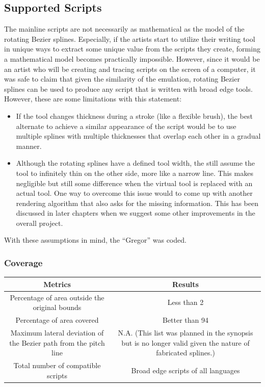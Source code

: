 \subsection{Supported Scripts}
The mainline scripts are not necessarily as mathematical as the model of the rotating Bezier splines. Especially, if the artists start to utilize their writing tool in unique ways to extract some unique value from the scripts they create, forming a mathematical model becomes practically impossible. However, since it would be an artist who will be creating and tracing scripts on the screen of a computer, it was safe to claim that given the similarity of the emulation, rotating Bezier splines can be used to produce any script that is written with broad edge tools. However, these are some limitations with this statement:

\begin{itemize}
\item If the tool changes thickness during a stroke (like a flexible brush), the best alternate to achieve a similar appearance of the script would be to use multiple splines with multiple thicknesses that overlap each other in a gradual manner.
\item Although the rotating splines have a defined tool width, the still assume the tool to infinitely thin on the other side, more like a narrow line. This makes negligible but still some difference when the virtual tool is replaced with an actual tool. One way to overcome this issue would to come up with another rendering algorithm that also asks for the missing information. This has been discussed in later chapters when we suggest some other improvements in the overall project.
\end{itemize}
With these assumptions in mind, the “Gregor” was coded.
\subsubsection{Coverage}
\begin{tabular}{|c|c|}
  \hline
Metrics & Results \\
  \hline
Percentage of area outside the original bounds & Less than 2 \\
Percentage of area covered&Better than 94 \\
Maximum lateral deviation of the Bezier path from the pitch line & N.A. (This list was planned in the synopsis but is no longer valid given the nature of fabricated splines.) \\
Total number of compatible scripts & Broad edge scripts of all languages \\
  \hline
\end{tabular}

